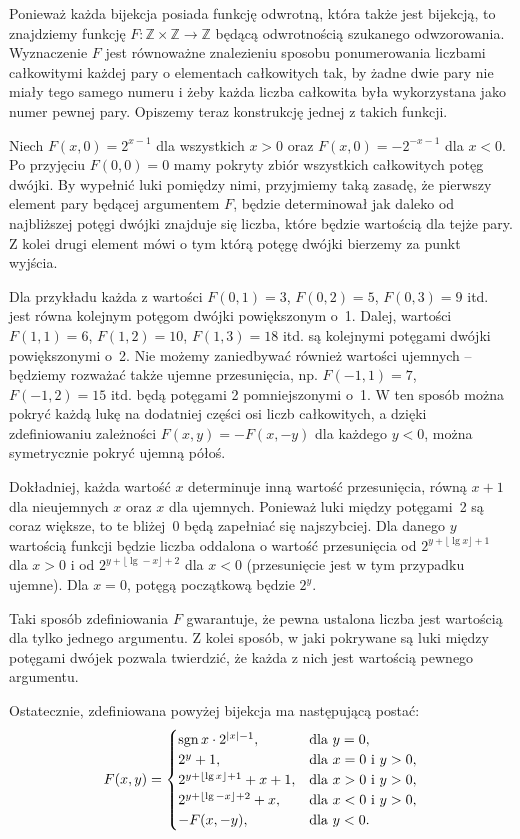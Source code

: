 \exercise{} %
Ponieważ każda bijekcja posiada funkcję odwrotną, która także jest bijekcją, to znajdziemy funkcję $F\colon\mathbb{Z}\times\mathbb{Z}\to\mathbb{Z}$ będącą odwrotnością szukanego odwzorowania. Wyznaczenie $F$ jest równoważne znalezieniu sposobu ponumerowania liczbami całkowitymi każdej pary o elementach całkowitych tak, by żadne dwie pary nie miały tego samego numeru i żeby każda liczba całkowita była wykorzystana jako numer pewnej pary. Opiszemy teraz konstrukcję jednej z takich funkcji.

Niech $F(x,0)=2^{x-1}$ dla wszystkich $x>0$ oraz $F(x,0)=-2^{-x-1}$ dla $x<0$. Po przyjęciu $F(0,0)=0$ mamy pokryty zbiór wszystkich całkowitych potęg dwójki. By wypełnić luki pomiędzy nimi, przyjmiemy taką zasadę, że pierwszy element pary będącej argumentem $F$, będzie determinował jak daleko od najbliższej potęgi dwójki znajduje się liczba, które będzie wartością dla tejże pary. Z kolei drugi element mówi o tym którą potęgę dwójki bierzemy za punkt wyjścia.

Dla przykładu każda z wartości $F(0,1)=3$, $F(0,2)=5$, $F(0,3)=9$ itd. jest równa kolejnym potęgom dwójki powiększonym o~1. Dalej, wartości $F(1,1)=6$, $F(1,2)=10$, $F(1,3)=18$ itd. są kolejnymi potęgami dwójki powiększonymi o~2. Nie możemy zaniedbywać również wartości ujemnych -- będziemy rozważać także ujemne przesunięcia, np. $F(-1,1)=7$, $F(-1,2)=15$ itd. będą potęgami 2 pomniejszonymi o~1. W ten sposób można pokryć każdą lukę na dodatniej części osi liczb całkowitych, a dzięki zdefiniowaniu zależności $F(x,y)=-F(x,-y)$ dla każdego $y<0$, można symetrycznie pokryć ujemną półoś.

Dokładniej, każda wartość $x$ determinuje inną wartość przesunięcia, równą $x+1$ dla nieujemnych $x$ oraz $x$ dla ujemnych. Ponieważ luki między potęgami~2 są coraz większe, to te bliżej~0 będą zapełniać się najszybciej. Dla danego $y$ wartością funkcji będzie liczba oddalona o wartość przesunięcia od $2^{y+\lfloor\lg x\rfloor+1}$ dla $x>0$ i od $2^{y+\lfloor\lg-x\rfloor+2}$ dla $x<0$ (przesunięcie jest w tym przypadku ujemne). Dla $x=0$, potęgą początkową będzie $2^y$.

Taki sposób zdefiniowania $F$ gwarantuje, że pewna ustalona liczba jest wartością dla tylko jednego argumentu. Z kolei sposób, w jaki pokrywane są luki między potęgami dwójek pozwala twierdzić, że każda z nich jest wartością pewnego argumentu.

Ostatecznie, zdefiniowana powyżej bijekcja ma następującą postać:
\[
	F(x,y) =
	\begin{cases}
		\operatorname{sgn} x\cdot2^{|x|-1}, & \text{dla $y=0$}, \\
		2^y+1, & \text{dla $x=0$ i $y>0$}, \\
		2^{y+\lfloor\lg x\rfloor+1}+x+1, & \text{dla $x>0$ i $y>0$}, \\
		2^{y+\lfloor\lg-x\rfloor+2}+x, & \text{dla $x<0$ i $y>0$}, \\
		-F(x,-y), & \text{dla $y<0$}.
	\end{cases}
\]

